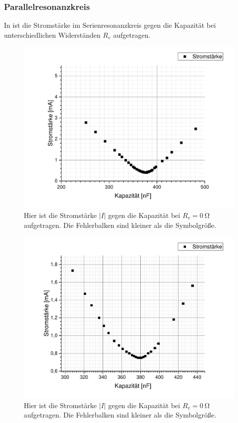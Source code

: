 \documentclass[
	a4paper,
	12pt,
	pagesize,
	ngerman
]{scrartcl}
\begin{document}
	\subsubsection{Parallelresonanzkreis}
	
	In  ist die Stromstärke im Serienresonanzkreis gegen die Kapazität bei unterschiedlichen Widerständen $ R_v $ aufgetragen.
	\begin{figure}[H]
		\includegraphics[width=1\textwidth]{Parallelstromkreis_inf}
		\centering
		\caption{Hier ist die Stromstärke $ \left| I \right| $ gegen die Kapazität bei $ R_v = \SI{0}{\ohm} $ aufgetragen. Die Fehlerbalken sind kleiner als die Symbolgröße.}
		\label{Para_2k}
		\centering
	\end{figure} 
	\begin{figure}[H]
		\includegraphics[width=1\textwidth]{Parallelstromkreis_10k}
		\centering
		\caption{Hier ist die Stromstärke $ \left| I \right| $ gegen die Kapazität bei $ R_v = \SI{0}{\ohm} $ aufgetragen. Die Fehlerbalken sind kleiner als die Symbolgröße.}
		\label{Para_10k}
		\centering
	\end{figure} 
\end{document}

